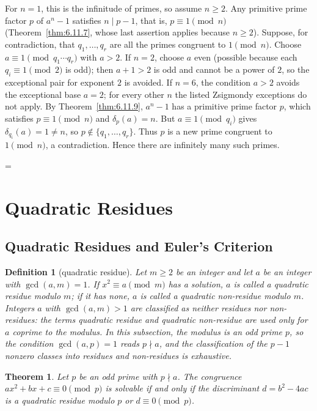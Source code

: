 \documentclass[11pt]{article}
\makeatletter
\theoremstyle{ntstyle}
\newtheorem{theorem}{Theorem}[subsection]
\newtheorem{definition}{Definition}[subsection]
\let\nt@closedisplay\]
\def\nt@guardedclose{\@ifnextchar\par{\nt@closeafterpar}{\@ifnextchar\end{\postdisplaypenalty\@M\nt@closedisplay}{\nt@closedisplay}}}
\def\nt@closeafterpar\par{\@ifnextchar\par{\nt@closeafterpar}{\@ifnextchar\end{\postdisplaypenalty\@M\nt@closedisplay\par}{\nt@closedisplay\par}}}
\renewenvironment{proof}[1][\proofname]{\par
  \pushQED{\qed}\normalfont\topsep\medskipamount\edef\nt@afterproof{\@endparpenalty=\the\@endparpenalty\relax}\@beginparpenalty\@M\@endparpenalty\@M\let\]\nt@guardedclose\trivlist\item[]\textit{#1\@addpunct{.}} \ignorespaces}{\ifvmode\addpenalty\@M\fi\popQED\nt@afterproof\endtrivlist\@endpefalse}
\makeatother
\begin{document}
\begin{proof} For $n = 1$, this is the infinitude of
	primes, so assume $n \ge 2$. Any primitive prime factor $p$ of $a^{n} -
		1$ satisfies $n \mid p - 1$, that is, $p \equiv 1 \pmod{n}$ (Theorem~\ref{thm:6.11.7}, whose last assertion applies because $n \ge 2$). Suppose, for contradiction, that $q_1, \ldots, q_r$ are all
	the primes congruent to $1 \pmod{n}$. Choose $a\equiv1\pmod{q_1\cdots q_r}$ with $a>2$. If $n=2$, choose $a$ even (possible because each $q_i\equiv1\pmod 2$ is odd); then $a+1>2$ is odd and cannot be a power of $2$, so the exceptional pair for exponent $2$ is avoided. If $n=6$, the condition $a>2$ avoids the exceptional base $a=2$; for every other $n$ the listed Zsigmondy exceptions do not apply. By Theorem~\ref{thm:6.11.9}, $a^{n} - 1$ has a primitive
	prime factor $p$, which satisfies $p \equiv 1 \pmod{n}$ and
	$\delta_p(a) = n$. But $a \equiv 1 \pmod{q_i}$ gives
	$\delta_{q_i}(a) = 1 \neq n$, so $p \notin \{q_1, \ldots,
		q_r\}$. Thus $p$ is a new prime congruent to $1 \pmod{n}$, a contradiction. Hence there
	are infinitely many such primes.

\end{proof}
\clearpage

\section{Quadratic Residues}

\subsection{Quadratic Residues and Euler's Criterion}

\begin{definition}[quadratic residue]\label{def:7.1.1} Let $m \ge 2$ be an integer and let
	$a$ be an integer with $\gcd(a, m) = 1$. If $x^{2} \equiv a \pmod{m}$
	has a solution, $a$ is called a quadratic residue modulo $m$; if it
	has none, $a$ is called a quadratic non-residue modulo $m$. Integers
	$a$ with $\gcd(a, m) > 1$ are classified as neither residues nor non-residues: the terms
	quadratic residue and quadratic non-residue are used only for $a$
	coprime to the modulus. In this subsection, the modulus is an odd prime
	$p$, so the condition $\gcd(a, p) = 1$ reads $p \nmid a$, and the
	classification of the $p-1$ nonzero classes into residues and
	non-residues is exhaustive.

\end{definition}
\begin{theorem}\label{thm:7.1.1} Let $p$ be an odd prime with $p \nmid a$. The congruence
	$ax^{2} + bx + c \equiv 0 \pmod{p}$ is solvable if and only if the
	discriminant $d = b^{2} - 4ac$ is a quadratic residue modulo $p$ or
	$d \equiv 0 \pmod{p}$.

\end{theorem}
\end{document}
